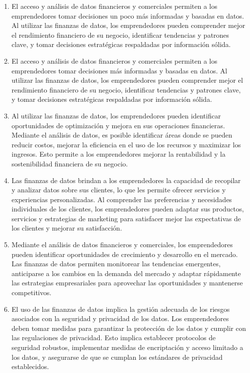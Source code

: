 \documentclass[
  letterpaper,
  DIV=11,
  numbers=noendperiod]{scrreprt}
\begin{document}
\begin{enumerate}
\def\labelenumi{\arabic{enumi}.}
\item
  El acceso y análisis de datos financieros y comerciales permiten a los
  emprendedores tomar decisiones un poco más informadas y basadas en
  datos. Al utilizar las finanzas de datos, los emprendedores pueden
  comprender mejor el rendimiento financiero de su negocio, identificar
  tendencias y patrones clave, y tomar decisiones estratégicas
  respaldadas por información sólida.
\item
  El acceso y análisis de datos financieros y comerciales permiten a los
  emprendedores tomar decisiones más informadas y basadas en datos. Al
  utilizar las finanzas de datos, los emprendedores pueden comprender
  mejor el rendimiento financiero de su negocio, identificar tendencias
  y patrones clave, y tomar decisiones estratégicas respaldadas por
  información sólida.
\item
  Al utilizar las finanzas de datos, los emprendedores pueden
  identificar oportunidades de optimización y mejora en sus operaciones
  financieras. Mediante el análisis de datos, es posible identificar
  áreas donde se pueden reducir costos, mejorar la eficiencia en el uso
  de los recursos y maximizar los ingresos. Esto permite a los
  emprendedores mejorar la rentabilidad y la sostenibilidad financiera
  de su negocio.
\item
  Las finanzas de datos brindan a los emprendedores la capacidad de
  recopilar y analizar datos sobre sus clientes, lo que les permite
  ofrecer servicios y experiencias personalizadas. Al comprender las
  preferencias y necesidades individuales de los clientes, los
  emprendedores pueden adaptar sus productos, servicios y estrategias de
  marketing para satisfacer mejor las expectativas de los clientes y
  mejorar su satisfacción.
\item
  Mediante el análisis de datos financieros y comerciales, los
  emprendedores pueden identificar oportunidades de crecimiento y
  desarrollo en el mercado. Las finanzas de datos permiten monitorear
  las tendencias emergentes, anticiparse a los cambios en la demanda del
  mercado y adaptar rápidamente las estrategias empresariales para
  aprovechar las oportunidades y mantenerse competitivos.
\item
  El uso de las finanzas de datos implica la gestión adecuada de los
  riesgos asociados con la seguridad y privacidad de los datos. Los
  emprendedores deben tomar medidas para garantizar la protección de los
  datos y cumplir con las regulaciones de privacidad. Esto implica
  establecer protocolos de seguridad robustos, implementar medidas de
  encriptación y acceso limitado a los datos, y asegurarse de que se
  cumplan los estándares de privacidad establecidos.
\end{enumerate}
\end{document}
